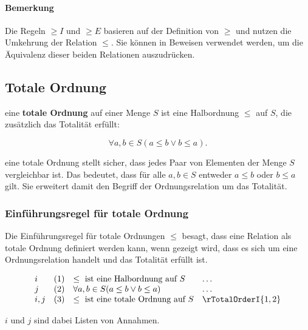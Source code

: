 \documentclass[main.tex]{subfiles}
\begin{document}
\paragraph{Bemerkung}

Die Regeln \(\geq I\) und \(\geq E\) basieren auf der Definition von \(\geq\) und nutzen die Umkehrung der Relation \(\leq\). Sie können in Beweisen verwendet werden, um die Äquivalenz dieser beiden Relationen auszudrücken.

\subsection{Totale Ordnung}

\begin{definition}
    eine \textbf{totale Ordnung} auf einer Menge \(S\) ist eine Halbordnung \(\leq\) auf \(S\), die zusätzlich das Totalität erfüllt:
    
    \[
    \forall a, b \in S (a \leq b \lor b \leq a).
    \]
\end{definition}

\begin{remark}
    eine totale Ordnung stellt sicher, dass jedes Paar von Elementen der Menge \(S\) vergleichbar ist. Das bedeutet, dass für alle \(a, b \in S\) entweder \(a \leq b\) oder \(b \leq a\) gilt. Sie erweitert damit den Begriff der Ordnungsrelation um das Totalität.
\end{remark}

\subsubsection*{Einführungsregel für totale Ordnung}
\label{rule:rTotalOrderI}
Die Einführungsregel für totale Ordnungen \(\leq\) besagt, dass eine Relation als totale Ordnung definiert werden kann, wenn gezeigt wird, dass es sich um eine Ordnungsrelation handelt und das Totalität erfüllt ist.

\[
\begin{array}{llll}
    i       & (1) & \leq \text{ ist eine Halbordnung auf } S & \dots \\
    j       & (2) & \forall a, b \in S (a \leq b \lor b \leq a) & \dots \\
    i,j     & (3) & \leq \text{ ist eine totale Ordnung auf } S & \rTotalOrderI{1,2}
\end{array}
\]

\(i\) und \(j\) sind dabei Listen von Annahmen.
\end{document}
